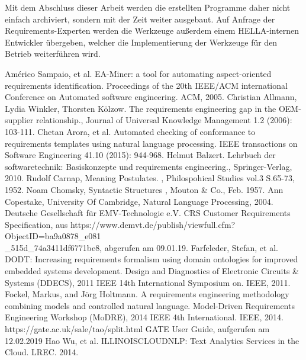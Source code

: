 \documentclass[12pt]{report}
\begin{document}
Mit dem Abschluss dieser Arbeit werden die erstellten Programme daher nicht einfach archiviert, sondern mit der Zeit weiter ausgebaut.
Auf Anfrage der Requirements-Experten werden die Werkzeuge außerdem einem HELLA-internen Entwickler übergeben, welcher die Implementierung der Werkzeuge für den Betrieb weiterführen wird. 

\newpage
\begin{thebibliography}{20}
Américo Sampaio, et al. \glqq EA-Miner: a tool for automating aspect-oriented requirements identification.\grqq{} Proceedings of the 20th IEEE/ACM international Conference on Automated software engineering. ACM, 2005.
 Christian Allmann, Lydia Winkler, Thorsten Kölzow. \glqq The requirements engineering gap in the OEM-supplier relationship.\grqq , Journal of Universal Knowledge Management 1.2 (2006): 103-111.
Chetan Arora, et al. \glqq Automated checking of conformance to requirements templates using natural language processing.\grqq{} IEEE transactions on Software Engineering 41.10 (2015): 944-968.
Helmut Balzert. \glqq Lehrbuch der softwaretechnik: Basiskonzepte und requirements engineering.\grqq , Springer-Verlag, 2010.
Rudolf Carnap, \glqq  Meaning Postulates.\grqq{} , Philospohical Studies vol.3 S.65-73, 1952.
 Noam Chomsky, \glqq  Syntactic Structures\grqq{} , Mouton \& Co., Feb. 1957.
Ann Copestake, University Of Cambridge, \glqq Natural Language Processing\grqq , 2004.
 Deutsche Gesellschaft für EMV-Technologie e.V. \glqq CRS Customer Requirements Specification\grqq, aus https://www.demvt.de/publish/viewfull.cfm?ObjectID=ba9a0878\_e081\\ \_515d\_74a3411df6771be8, abgerufen am 09.01.19.
 Farfeleder, Stefan, et al. \glqq DODT: Increasing requirements formalism using domain ontologies for improved embedded systems development. \grqq{} Design and Diagnostics of Electronic Circuits \& Systems (DDECS), 2011 IEEE 14th International Symposium on. IEEE, 2011.
 Fockel, Markus, and Jörg Holtmann. \glqq A requirements engineering methodology combining models and controlled natural language.\grqq{} Model-Driven Requirements Engineering Workshop (MoDRE), 2014 IEEE 4th International. IEEE, 2014.
 https://gate.ac.uk/sale/tao/split.html GATE User Guide, aufgerufen am 12.02.2019
 Hao Wu, et al. \glqq  ILLINOISCLOUDNLP: Text Analytics Services in the Cloud.\grqq{}  LREC. 2014.

\end{thebibliography}
\end{document}
